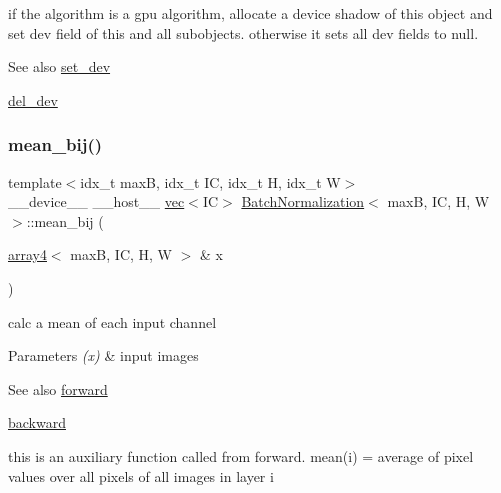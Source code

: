if the algorithm is a gpu algorithm, allocate a device shadow of this object and set dev field of this and all subobjects. otherwise it sets all dev fields to null. 

\begin{DoxySeeAlso}{See also}
\hyperlink{structBatchNormalization_a05caf41d5a21914b07652d356fde7387}{set\+\_\+dev} 

\hyperlink{structBatchNormalization_a3698340b540985a0cb1d5d2711fc8334}{del\+\_\+dev} 
\end{DoxySeeAlso}
\mbox{\label{structBatchNormalization_a0d4c799cedf33dae08d3b46f417c1ecf}} 
\subsubsection{\texorpdfstring{mean\+\_\+bij()}{mean\_bij()}}
{\footnotesize\ttfamily template$<$idx\+\_\+t maxB, idx\+\_\+t IC, idx\+\_\+t H, idx\+\_\+t W$>$ \\
\+\_\+\+\_\+device\+\_\+\+\_\+ \+\_\+\+\_\+host\+\_\+\+\_\+ \hyperlink{structvec}{vec}$<$IC$>$ \hyperlink{structBatchNormalization}{Batch\+Normalization}$<$ maxB, IC, H, W $>$\+::mean\+\_\+bij (\begin{DoxyParamCaption}\item[{\hyperlink{structarray4}{array4}$<$ maxB, IC, H, W $>$ \&}]{x }\end{DoxyParamCaption})\hspace{0.3cm}{\ttfamily [inline]}}



calc a mean of each input channel 


\begin{DoxyParams}{Parameters}
{\em (x)} & input images \\
\hline
\end{DoxyParams}
\begin{DoxySeeAlso}{See also}
\hyperlink{structBatchNormalization_a315cda9d48dfa18a2f4f65ac7bb3b891}{forward} 

\hyperlink{structBatchNormalization_a3b6d987026effdc6c3a2c99e54ae58f9}{backward}
\end{DoxySeeAlso}
this is an auxiliary function called from forward. mean(i) = average of pixel values over all pixels of all images in layer i \mbox{\label{structBatchNormalization_acf65ad8948335d6a4ebff9ba2a0ab906}} 
